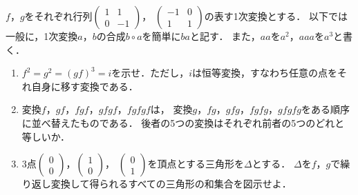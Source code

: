 \documentclass[../../main.tex]{subfiles}
\begin{document}
$f$，$g$をそれぞれ行列$
\begin{pmatrix} 1 & 1 \\ 0 & -1
\end{pmatrix}$，
$
\begin{pmatrix} -1 & 0 \\ 1 & 1
\end{pmatrix}$の表す1次変換とする．
以下では一般に，1次変換$a$，$b$の合成$b \circ a$を簡単に$ba$と記す．
また，$aa$を$a^2$，$aaa$を$a^3$と書く．
\begin{enumerate}
  \item $f^2=g^2={(gf)}^3=i$を示せ．ただし，$i$は恒等変換，すなわち任意の点をそれ自身に移す変換である．
  \item 変換$f$，$gf$，$fgf$，$gfgf$，$fgfgf$は，
    変換$g$，$fg$，$gfg$，$fgfg$，$gfgfg$をある順序に並べ替えたものである．
    後者の5つの変換はそれぞれ前者の5つのどれと等しいか．
  \item 3点$
    \begin{pmatrix} 0 \\ 0
    \end{pmatrix}$，$
    \begin{pmatrix} 1 \\ 0
    \end{pmatrix}$，
    $
    \begin{pmatrix} 0 \\ 1
    \end{pmatrix}$を頂点とする三角形を$\Delta$とする．
    $\Delta$を$f$，$g$で繰り返し変換して得られるすべての三角形の和集合を図示せよ．
\end{enumerate}
\end{document}
